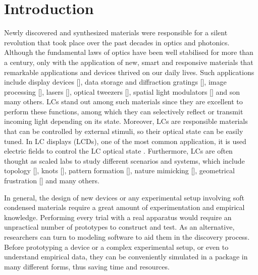 \documentclass[final,5p,times,twocolumn]{elsarticle}
\begin{document}
\section{Introduction}
\label{Introduction}

Newly discovered and synthesized materials were responsible for a silent revolution that took place over the past decades in optics and photonics. Although the fundamental laws of optics have been well stabilised for more than a century, only with the application of new, smart and responsive materials that remarkable applications and devices thrived on our daily lives.  Such applications include display devices [], data storage and diffraction gratings [], image processing [], lasers [], optical tweezers [], spatial light modulators [] and son many others. LCs stand out among such materials since they are excellent to perform these functions, among which they can selectively reflect or transmit incoming light depending on its state. Moreover, LCs are responsible materials that can be controlled by  external stimuli, so their optical state can be easily tuned. In LC displays (LCDs), one of the most common application, it is used electric fields to control the LC optical state \cite{wu2006fundamentals}. Furthermore, LCs are often thought as scaled labs to study different scenarios and systems, which include topology [], knots [], pattern formation [], nature mimicking [], geometrical frustration [] and many others.


In general, the design of new devices or any experimental setup involving soft condensed materials require a great amount of experimentation
and empirical knowledge. Performing every trial with a real apparatus
would require an unpractical number of prototypes to construct and
test. As an alternative, researchers can turn to modeling
software to aid them in the discovery process. Before prototyping a device or a complex experimental setup, or even to understand empirical data, they can be conveniently simulated in a package in many different forms, thus saving time and resources.
\end{document}
